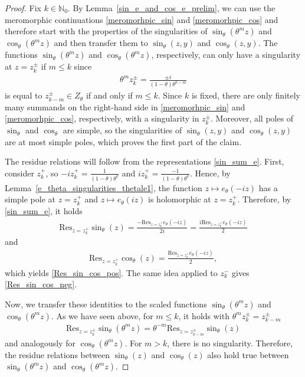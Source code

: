 \documentclass[12pt]{article}
\newcommand{\N}{\mathbb{N}} %
\newcommand{\1}{\mathds{1}}
\theoremstyle{definition}
\theoremstyle{plain}
\theoremstyle{remark}
\begin{document}
 \begin{proof}
    Fix $k\in\N_0$. By Lemma~\ref{sin_e_and_cos_e_prelim}, we can use the meromorphic continuations \eqref{meromorhpic_sin} and \eqref{meromorhpic_cos}
     and therefore start with the properties of the singularities of $\sin_\theta(\theta^m z)$ and $\cos_\theta(\theta^m z)$ and then transfer them to $\sin_\theta(z,y)$ and $\cos_\theta(z,y)$. The functions $\sin_\theta(\theta^m z)$ and $\cos_\theta(\theta^m z)$, respectively, can only have a singularity at $z=z_k^\pm$ if $m\le k$ since 
    \begin{align*}
        \theta^mz_k^\pm=\frac{\pm i}{(1-\theta)\theta^{k-m}}
    \end{align*}
    is equal to $ z_{k-m}^\pm\in Z_\theta$ if and only if $m\le k$. Since $k$ is fixed, there are only finitely many summands on the right-hand side in \eqref{meromorhpic_sin} and \eqref{meromorhpic_cos}, respectively, with a singularity in $z_k^\pm$. Moreover, all poles of $\sin_\theta$ and $\cos_\theta$ are simple, so the singularities of $\sin_\theta(z,y)$ and $\cos_\theta(z,y)$ are at most simple poles, which proves the first part of the claim.
    
    The residue relations will follow from the representations \eqref{sin_sum_e}. 
    First, consider $z_k^+$, so $-iz_k^+=\frac{1}{(1-\theta)\theta ^k}$ and $iz_k^+=\frac{-1}{(1-\theta)\theta ^k}$. Hence, by Lemma~\ref{e_theta_singularities_thetale1}, the function $z\mapsto e_\theta(-iz)$ has a simple pole at $z=z_k^+$ and $z\mapsto e_\theta(iz)$ is holomorphic at $z=z_k^+$. Therefore, by \eqref{sin_sum_e},
    it holds
    \begin{align*}
        \mathrm{Res}_{z=z_k^+}\sin_\theta(z)=\frac{-\mathrm{Res}_{z=z_k^+}e_\theta(-iz)}{2i}=
        \frac{i\mathrm{Res}_{z=z_k^+}e_\theta(-iz)}{2}
    \end{align*}
    and
    \begin{align*}
        \mathrm{Res}_{z=z_k^+}\cos_\theta(z)=\frac{\mathrm{Res}_{z=z_k^+}e_\theta(-iz)}{2},
    \end{align*}
    which yields \eqref{Res_sin_cos_pos}.
    The same idea applied to $z_k^-$ gives \eqref{Res_sin_cos_neg}.
    
    Now, we transfer these identities to the scaled functions $\sin_\theta(\theta^m z)$ and $\cos_\theta(\theta^m z)$. As we have seen above, for $m\le k$, it holds with $\theta^m z_k^\pm=z_{k-m}^\pm$
    \begin{align*}
        \mathrm{Res}_{z=z_k^\pm}\sin_\theta(\theta ^mz)=\theta^{-m}\mathrm{Res}_{z=z_{k-m}^\pm}\sin_\theta(z)
    \end{align*}
    and analogously for $\cos_\theta(\theta^m z)$. For $m>k$, there is no singularity. Therefore, the residue relations between $\sin_\theta(z)$ and $\cos_\theta(z)$ also hold true between $\sin_\theta(\theta^mz)$ and $\cos_\theta(\theta^m z)$.
    

\end{proof}
\end{document}
